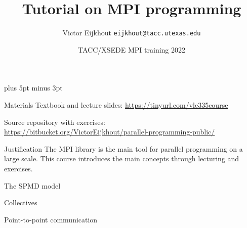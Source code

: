 \documentclass[11pt,headernav]{beamer}
\def\Location{}%
\def\courseyear{2022}
\def\Location{TACC HPC Training \courseyear}
\newcounter{tacc}
\def\Location{TACC/XSEDE MPI training \courseyear}
\def\TitleExtra{}
\begin{document}
\parskip=10pt plus 5pt minus 3pt

\title{Tutorial on MPI programming\TitleExtra}
\author{Victor Eijkhout {\tt eijkhout@tacc.utexas.edu}}
\date{\Location}

\begin{frame}
  \titlepage
\end{frame}

\begin{xsede}
  
\end{xsede}

\begin{frame}{Materials}
  Textbook and lecture slides: \url{https://tinyurl.com/vle335course}

  Source repository with exercises:\\
  \url{https://bitbucket.org/VictorEijkhout/parallel-programming-public/}
\end{frame}

\begin{frame}{Justification}
  The MPI library is the main tool
  for parallel programming on a large scale.
  This course introduces the main concepts
  through lecturing and exercises.
\end{frame}



\renewcommand\standardversion{3}

 {The SPMD model}


 {Collectives}


 {Point-to-point communication}


\iffalse
\begin{exerciseframe}[serialsend]
  
\end{exerciseframe}
\fi
\end{document}
